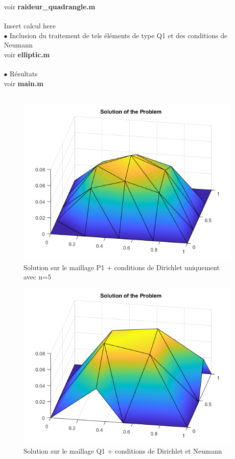 \documentclass{article}
\begin{document}
voir \textbf{raideur\_quadrangle.m} \\ \\
Insert calcul here \\

$\bullet$ Inclusion du traitement de tels éléments de type Q1 et des conditions de Neumann \\ 

voir \textbf{elliptic.m} \\ \\ 

$\bullet$ Résultats \\

voir \textbf{main.m} \\ \\ 
\begin{figure}[H]
\centering
\includegraphics[width=12cm]{P1.png}
\caption{Solution sur le maillage P1 + conditions de Dirichlet uniquement avec n=5}
\end{figure}

\begin{figure}[H]
\centering
\includegraphics[width=12cm]{Q1.png}
\caption{Solution sur le maillage Q1 + conditions de Dirichlet et Neumann}
\end{figure}
\end{document}
